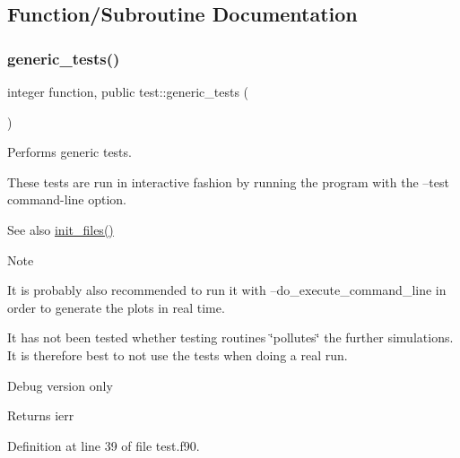 \subsection{Function/\+Subroutine Documentation}
\mbox{\label{namespacetest_aca21ee464c0b1f4b617177afdde110ec}} 
\subsubsection{\texorpdfstring{generic\+\_\+tests()}{generic\_tests()}}
{\footnotesize\ttfamily integer function, public test\+::generic\+\_\+tests (\begin{DoxyParamCaption}{ }\end{DoxyParamCaption})}



Performs generic tests. 

These tests are run in interactive fashion by running the program with the {\ttfamily --test} command-\/line option. \begin{DoxySeeAlso}{See also}
\hyperlink{namespacefiles__ops_a1e219b1147f109f758d03bef89d540e8}{init\+\_\+files()}
\end{DoxySeeAlso}
\begin{DoxyNote}{Note}

\begin{DoxyEnumerate}
\item It is probably also recommended to run it with {\ttfamily --do\+\_\+execute\+\_\+command\+\_\+line} in order to generate the plots in real time.
\item It has not been tested whether testing routines \char`\"{}pollutes\char`\"{} the further simulations. It is therefore best to not use the tests when doing a real run.
\end{DoxyEnumerate}

Debug version only
\end{DoxyNote}
\begin{DoxyReturn}{Returns}
ierr 
\end{DoxyReturn}


Definition at line 39 of file test.\+f90.

